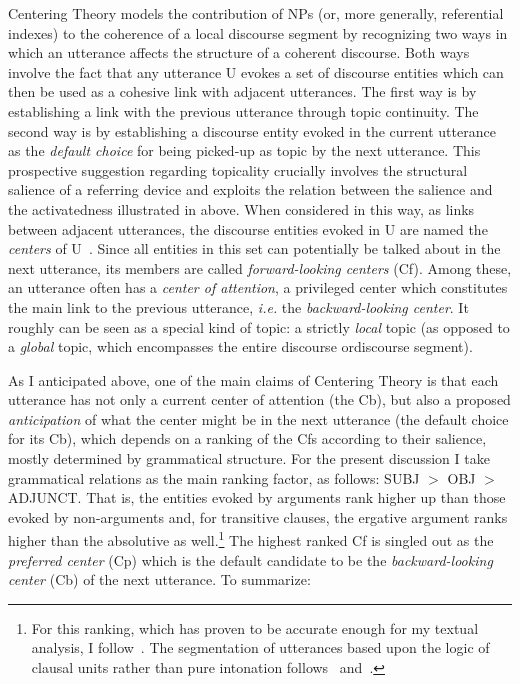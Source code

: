 \documentclass[output=paper
,modfonts
,nonflat]{langsci/langscibook}
\begin{document}
Centering Theory models the contribution of NPs (or, more generally, referential indexes) to the coherence of a local discourse segment by recognizing two ways in which an utterance affects the structure of a coherent discourse. Both ways involve the fact that any utterance U evokes a set of discourse entities which can then be used as a cohesive link with adjacent utterances. The first way is by establishing a link with the previous utterance through topic continuity. The second way is by establishing a discourse entity evoked in the current utterance as the \textit{default choice} for being picked-up as topic by the next utterance. This prospective suggestion regarding topicality crucially involves the structural salience of a referring device and exploits the relation between the salience and the activatedness illustrated in  above. When considered in this way, as links between adjacent utterances, the discourse entities evoked in U are named the \textit{centers} of U~\citep[208]{GroszEtAlii1995}. Since all entities in this set can potentially be talked about in the next utterance, its members are called \textit{forward-looking centers} (Cf). Among these, an utterance often has a \textit{center of attention}, a privileged center which constitutes the main link to the previous utterance, \textit{i.e.} the \textit{backward-looking center}. It roughly can be seen as a special kind of topic: a strictly \textit{local} topic (as opposed to a \textit{global} topic, which encompasses the entire discourse or\largerpage discourse segment). 

As I anticipated above, one of the main claims of Centering Theory is that each utterance has not only a current center of attention (the Cb), but also a proposed \textit{anticipation} of what the center might be in the next utterance (the default choice for its Cb), which depends on a ranking of the Cfs according to their salience, mostly determined by grammatical structure. For the present discussion I take grammatical relations as the main ranking factor, as follows: SUBJ $>$ OBJ $>$ ADJUNCT. That is, the entities evoked by arguments rank higher up than those evoked by non-arguments and, for transitive clauses, the ergative argument ranks higher than the absolutive as well.\footnote{For this ranking, which has proven to be accurate enough for my textual analysis, I follow~\citet[1837-1838]{Hedberg2010}. The segmentation of utterances based upon the logic of clausal units rather than pure intonation follows~\citet{Prince1999} and~\citet{Kibrik2011}.}
The highest ranked Cf is singled out as the \textit{preferred center} (Cp) which is the default candidate to be the \textit{backward-looking center} (Cb) of the next utterance. To summarize: 
\end{document}
